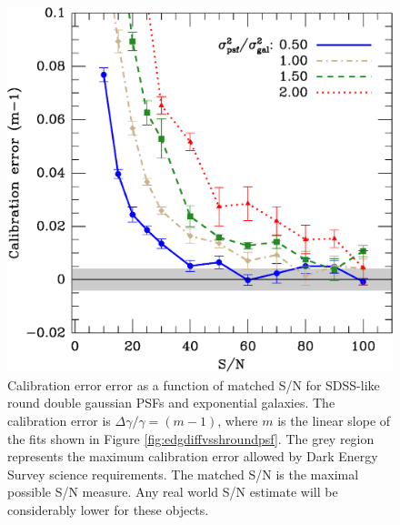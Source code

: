\documentclass[10pt,preprint]{aastex}
\newcommand{\psf}{PSF}
\begin{document}
\begin{figure}[t] \centering
 \centering 
 \includegraphics[scale=0.65]{figures/set-s2n-edg04-m-vs-shear.eps}

 \caption{Calibration error error as a function of matched S/N for SDSS-like
 round double gaussian \psf s and exponential galaxies.  The calibration error is
 $\Delta \gamma/\gamma = (m-1)$, where $m$ is the linear slope of the fits shown in
 Figure \ref{fig:edgdiffvsshroundpsf}.  The grey region represents the 
 maximum calibration error allowed by Dark Energy Survey science
 requirements.  The matched S/N is the maximal possible S/N measure.  Any real
 world S/N estimate will be considerably lower for these objects.} 

 \label{fig:edgcaliberr}

\end{figure}
\end{document}
